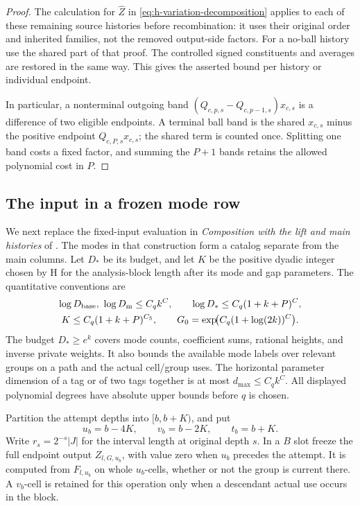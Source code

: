 \begin{proof}
The calculation for \(\widehat Z\) in
\eqref{eq:h-variation-decomposition} applies to each of these
remaining source histories before recombination: it uses their
original order and inherited families, not the removed output-side
factors.  For a no-ball history use the shared part of that proof.
The controlled signed constituents and averages are restored in
the same way.  This gives the asserted bound per history or
individual endpoint.

In particular, a nonterminal outgoing band
\((Q_{c,p,s}-Q_{c,p-1,s})x_{c,s}\) is a difference of two eligible
endpoints.  A terminal ball band is the shared \(x_{c,s}\) minus
the positive endpoint \(Q_{c,P,s}x_{c,s}\); the shared term is
counted once.  Splitting one band costs a fixed factor, and summing
the \(P+1\) bands retains the allowed polynomial cost in \(P\).
\end{proof}

\subsection{The input in a frozen mode row}

We next replace the fixed-input evaluation in
\emph{Composition with the lift and main histories} of
\cite[Section~8]{H}.  The modes in that construction form a
catalog separate from the main columns.  Let \(D_*\) be its budget,
and let \(K\) be the positive dyadic integer chosen by H for the
analysis-block length after its mode and gap parameters.  The
quantitative conventions are
\begin{equation}
 \begin{gathered}
 \log D_{\rm base},\ \log D_{\rm m}\le C_qk^C,\qquad
 \log D_*\le C_q(1+k+P)^C,\\
 K\le C_q(1+k+P)^{C_5},\qquad
 G_0=\exp\!\bigl(C_q(1+\log(2k))^C\bigr).
 \end{gathered}
 \label{eq:h-budget-hierarchy}
\end{equation}
The budget \(D_*\ge e^k\) covers mode counts, coefficient sums,
rational heights, and inverse private weights.  It also bounds the
available mode labels over relevant groups on a path and the actual
cell/group uses.  The horizontal parameter dimension of a tag or
of two tags together is at most
\(d_{\max}\le C_qk^C\).  All displayed polynomial degrees have
absolute upper bounds before \(q\) is chosen.

Partition the attempt depths into \([b,b+K)\), and put
\[
 u_b=b-4K,\qquad v_b=b-2K,\qquad t_b=b+K.
\]
Write \(r_s=2^{-s}|J|\) for the interval length at original depth \(s\).
In a \(B\) slot freeze the full endpoint output \(Z_{l,G,u_b}\),
with value zero when \(u_b\) precedes the attempt.  It is computed
from \(F_{l,u_b}\) on whole \(u_b\)-cells, whether or not the group
is current there.  A \(v_b\)-cell is retained for this operation
only when a descendant actual use occurs in the block.

